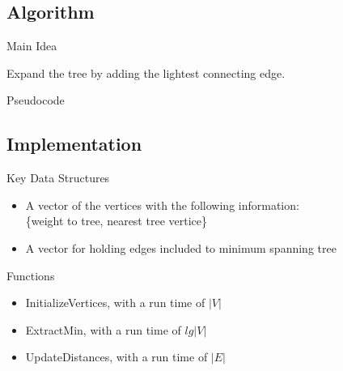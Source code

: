 \documentclass{beamer}
\begin{document}
\subsection{Algorithm}
\begin{frame}{Main Idea}
    \begin{center}
    Expand the tree by adding the lightest connecting edge.
    \end{center}
\end{frame}

\begin{frame}{Pseudocode}
\vprim
\end{frame}

\subsection{Implementation}
\begin{frame}{Key Data Structures}
    \begin{itemize}
    \item A vector of the vertices with the following information:\\
        \{weight to tree, nearest tree vertice\}
    \item A vector for holding edges included to minimum spanning tree
    \end{itemize}
\end{frame}

\begin{frame}{Functions}
    \begin{itemize}
    \item InitializeVertices, with a run time of $|V|$
    \item ExtractMin, with a run time of $lg|V|$
    \item UpdateDistances, with a run time of $|E|$
    \end{itemize}
\end{frame}
\end{document}
